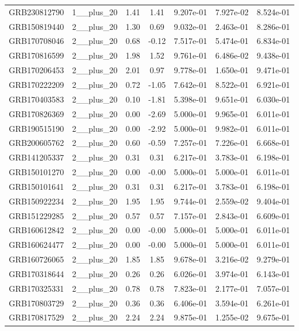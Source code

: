 \documentclass[12pt]{article}
\begin{document}
\begin{table}[h!]
{\begin{tabular}{l c c c c c c}
GRB230812790 & 1__plus_20 & 1.41 & 1.41 & 9.207e-01 & 7.927e-02 & 8.524e-01 \\
GRB150819440 & 2__plus_20 & 1.30 & 0.69 & 9.032e-01 & 2.463e-01 & 8.286e-01 \\
GRB170708046 & 2__plus_20 & 0.68 & -0.12 & 7.517e-01 & 5.474e-01 & 6.834e-01 \\
GRB170816599 & 2__plus_20 & 1.98 & 1.52 & 9.761e-01 & 6.486e-02 & 9.438e-01 \\
GRB170206453 & 2__plus_20 & 2.01 & 0.97 & 9.778e-01 & 1.650e-01 & 9.471e-01 \\
GRB170222209 & 2__plus_20 & 0.72 & -1.05 & 7.642e-01 & 8.522e-01 & 6.921e-01 \\
GRB170403583 & 2__plus_20 & 0.10 & -1.81 & 5.398e-01 & 9.651e-01 & 6.030e-01 \\
GRB170826369 & 2__plus_20 & 0.00 & -2.69 & 5.000e-01 & 9.965e-01 & 6.011e-01 \\
GRB190515190 & 2__plus_20 & 0.00 & -2.92 & 5.000e-01 & 9.982e-01 & 6.011e-01 \\
GRB200605762 & 2__plus_20 & 0.60 & -0.59 & 7.257e-01 & 7.226e-01 & 6.668e-01 \\
GRB141205337 & 2__plus_20 & 0.31 & 0.31 & 6.217e-01 & 3.783e-01 & 6.198e-01 \\
GRB150101270 & 2__plus_20 & 0.00 & -0.00 & 5.000e-01 & 5.000e-01 & 6.011e-01 \\
GRB150101641 & 2__plus_20 & 0.31 & 0.31 & 6.217e-01 & 3.783e-01 & 6.198e-01 \\
GRB150922234 & 2__plus_20 & 1.95 & 1.95 & 9.744e-01 & 2.559e-02 & 9.404e-01 \\
GRB151229285 & 2__plus_20 & 0.57 & 0.57 & 7.157e-01 & 2.843e-01 & 6.609e-01 \\
GRB160612842 & 2__plus_20 & 0.00 & -0.00 & 5.000e-01 & 5.000e-01 & 6.011e-01 \\
GRB160624477 & 2__plus_20 & 0.00 & -0.00 & 5.000e-01 & 5.000e-01 & 6.011e-01 \\
GRB160726065 & 2__plus_20 & 1.85 & 1.85 & 9.678e-01 & 3.216e-02 & 9.279e-01 \\
GRB170318644 & 2__plus_20 & 0.26 & 0.26 & 6.026e-01 & 3.974e-01 & 6.143e-01 \\
GRB170325331 & 2__plus_20 & 0.78 & 0.78 & 7.823e-01 & 2.177e-01 & 7.057e-01 \\
GRB170803729 & 2__plus_20 & 0.36 & 0.36 & 6.406e-01 & 3.594e-01 & 6.261e-01 \\
GRB170817529 & 2__plus_20 & 2.24 & 2.24 & 9.875e-01 & 1.255e-02 & 9.675e-01 \\

\end{tabular}}
\end{table}
\end{document}
